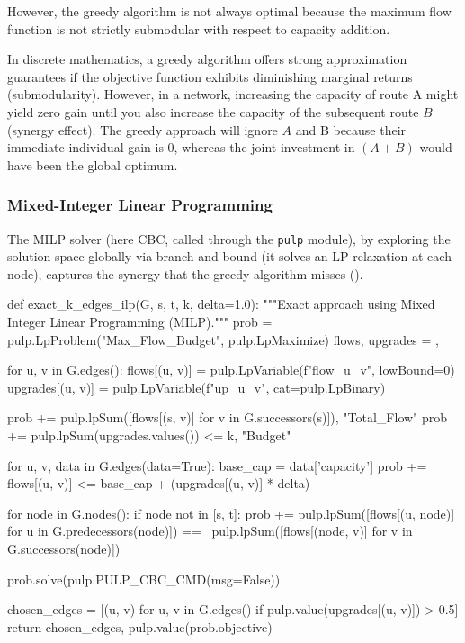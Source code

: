 \documentclass[12pt, openany]{article}
\begin{document}
However, the greedy algorithm is not always optimal because the maximum flow function is not strictly submodular with respect to capacity addition.

In discrete mathematics, a greedy algorithm offers strong approximation guarantees if the objective function exhibits diminishing marginal returns (submodularity). However, in a network, increasing the capacity of route A might yield zero gain until you also increase the capacity of the subsequent route $B$ (synergy effect). The greedy approach will ignore $A$ and B because their immediate individual gain is $0$, whereas the joint investment in $(A + B)$ would have been the global optimum.

\subsubsection{Mixed-Integer Linear Programming}

The MILP solver (here CBC, called through the \texttt{pulp} module), by exploring the solution space globally via branch-and-bound (it solves an LP relaxation at each node), captures the synergy that the greedy algorithm misses ().


\begin{python}[caption={Python code for the greedy approach in order to identify the sequence of $k$ edges under budget constraint},  label={lst:3_ilp_method_lst}]
def exact_k_edges_ilp(G, s, t, k, delta=1.0):
    """Exact approach using Mixed Integer Linear Programming (MILP)."""
    prob = pulp.LpProblem("Max_Flow_Budget", pulp.LpMaximize)
    flows, upgrades = {}, {}
    
    for u, v in G.edges():
        flows[(u, v)] = pulp.LpVariable(f"flow_{u}_{v}", lowBound=0)
        upgrades[(u, v)] = pulp.LpVariable(f"up_{u}_{v}", cat=pulp.LpBinary)
        
    prob += pulp.lpSum([flows[(s, v)] for v in G.successors(s)]), "Total_Flow"
    prob += pulp.lpSum(upgrades.values()) <= k, "Budget"
    
    for u, v, data in G.edges(data=True):
        base_cap = data['capacity']
        prob += flows[(u, v)] <= base_cap + (upgrades[(u, v)] * delta)
        
    for node in G.nodes():
        if node not in [s, t]:
            prob += pulp.lpSum([flows[(u, node)] for u in G.predecessors(node)]) == \
                    pulp.lpSum([flows[(node, v)] for v in G.successors(node)])
            
    prob.solve(pulp.PULP_CBC_CMD(msg=False))
    
    chosen_edges = [(u, v) for u, v in G.edges() if pulp.value(upgrades[(u, v)]) > 0.5]
    return chosen_edges, pulp.value(prob.objective)
\end{python}
\end{document}
